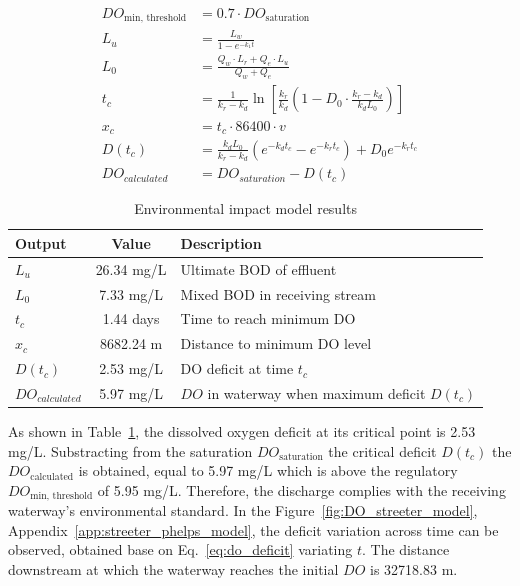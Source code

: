 \documentclass[11pt]{article}
\begin{document}
\begin{align}
DO_{\text{min, threshold}} &= 0.7 \cdot DO_{\text{saturation}} \label{eq:do_threshold} \\
L_u &= \frac{L_w}{1 - e^{-k_1 t}} \label{eq:ultimate_bod} \\
L_0 &= \frac{Q_w \cdot L_r + Q_e \cdot L_u}{Q_w + Q_e} \label{eq:mixing_zone_bod} \\
t_c &= \frac{1}{k_r - k_d} \ln \left[ \frac{k_r}{k_d} \left(1 - D_0 \cdot \frac{k_r - k_d}{k_d L_0} \right) \right] \label{eq:tc} \\
x_c &= t_c \cdot 86400 \cdot v \label{eq:distance_min_do} \\
D(t_c) &= \frac{k_d L_0}{k_r - k_d} \left(e^{-k_d t_c} - e^{-k_r t_c}\right) + D_0 e^{-k_r t_c} \label{eq:do_deficit}\\
DO_{calculated} &=DO_{saturation}-D(t_c) \label{eq:do_calculated}
\end{align}


\begin{table}[h]
\centering
\caption{Environmental impact model results}
\label{tab:env_outputs}
\begin{tabular}{|l|c|l|}
\hline
\textbf{Output} & \textbf{Value} & \textbf{Description} \\
\hline
$L_u$ & 
26.34
mg/L & Ultimate BOD of effluent \\
$L_0$ & 
7.33
mg/L & Mixed BOD in receiving stream \\
$t_c$ & 
1.44
 days & Time to reach minimum DO \\
$x_c$ & 
8682.24
m & Distance to minimum DO level \\
$D(t_c)$ & 
2.53
 mg/L & DO deficit at time $t_c$ \\
$DO_{calculated}$ &
5.97
 mg/L & $DO$ in waterway when maximum deficit $D(t_c)$ \\
\hline
\end{tabular}
\end{table}



As shown in Table~\ref{tab:env_outputs}, 
the dissolved oxygen deficit at its critical point is 
2.53
 mg/L. Substracting from the saturation $DO_\text{saturation}$ 
 the critical deficit $D(t_c)$ the $DO_\text{calculated}$ is obtained, 
 equal to 
5.97
 mg/L
which is above the regulatory $DO_\text{min, threshold}$ of 
5.95 mg/L. Therefore, the discharge 
complies with the receiving waterway's environmental standard. In the Figure~\ref{fig:DO_streeter_model}, Appendix~\ref{app:streeter_phelps_model}, the deficit variation across time can be observed,
obtained base on Eq.~\eqref{eq:do_deficit} variating $t$. The distance downstream at 
which the waterway reaches the initial $DO$ is 32718.83 m. 
\end{document}
